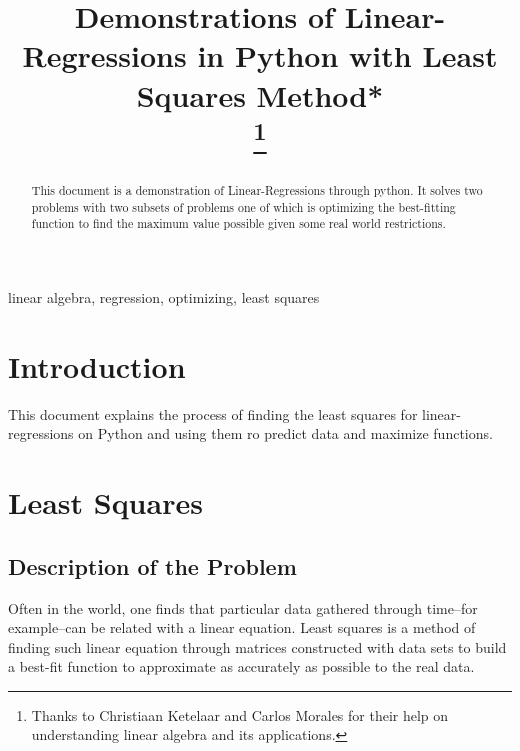 \documentclass[letterpaper, conference]{IEEEtran}
\begin{document}
	
	\title{Demonstrations of Linear-Regressions in Python with Least Squares Method*\\
		\thanks{Thanks to Christiaan Ketelaar and Carlos Morales for their help on understanding linear algebra and its applications.}
	}
	
	\author{
}
	
	\maketitle
	
	\begin{abstract}
		This document is a demonstration of Linear-Regressions through python. It solves two problems with two subsets of problems one of which is optimizing the best-fitting function to find the maximum value possible given some real world restrictions.
	\end{abstract}
	
	\begin{IEEEkeywords}
		linear algebra, regression, optimizing, least squares
	\end{IEEEkeywords}
	
	\section{Introduction}
		This document explains the process of finding the least squares for linear-regressions on Python and using them ro predict data and maximize functions.
	
	\section{Least Squares}
		\subsection{Description of the Problem}
			Often in the world, one finds that particular data gathered through time--for example--can be related with a linear equation. 
			Least squares is a method of finding such linear equation through matrices constructed with data sets to build a best-fit function to approximate as accurately as possible to the real data. 
			
\end{document}
